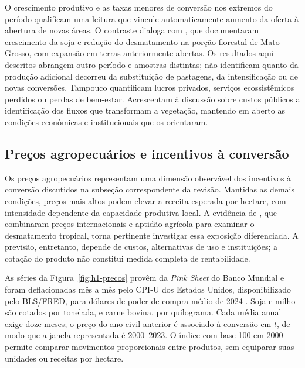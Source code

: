 \FloatBarrier
O crescimento produtivo e as taxas menores de conversão nos extremos do período qualificam uma leitura que vincule automaticamente aumento da oferta à abertura de novas áreas. O contraste dialoga com , que documentaram crescimento da soja e redução do desmatamento na porção florestal de Mato Grosso, com expansão em terras anteriormente abertas. Os resultados aqui descritos abrangem outro período e amostras distintas; não identificam quanto da produção adicional decorreu da substituição de pastagens, da intensificação ou de novas conversões. Tampouco quantificam lucros privados, serviços ecossistêmicos perdidos ou perdas de bem-estar. Acrescentam à discussão sobre custos públicos a identificação dos fluxos que transformam a vegetação, mantendo em aberto as condições econômicas e institucionais que os orientaram.

\FloatBarrier
\subsection{Preços agropecuários e incentivos à conversão}
\label{subsec:mt-precos}

Os preços agropecuários representam uma dimensão observável dos incentivos à conversão discutidos na subseção correspondente da revisão. Mantidas as demais condições, preços mais altos podem elevar a receita esperada por hectare, com intensidade dependente da capacidade produtiva local. A evidência de , que combinaram preços internacionais e aptidão agrícola para examinar o desmatamento tropical, torna pertinente investigar essa exposição diferenciada. A previsão, entretanto, depende de custos, alternativas de uso e instituições; a cotação do produto não constitui medida completa de rentabilidade.

As séries da Figura~\ref{fig:h1-precos} provêm da \textit{Pink Sheet} do Banco Mundial \cite{WorldBank2026} e foram deflacionadas mês a mês pelo CPI-U dos Estados Unidos, disponibilizado pelo BLS/FRED, para dólares de poder de compra médio de 2024 \cite{BLSCPI2026}. Soja e milho são cotados por tonelada, e carne bovina, por quilograma. Cada média anual exige doze meses; o preço do ano civil anterior é associado à conversão em $t$, de modo que a janela representada é 2000--2023. O índice com base 100 em 2000 permite comparar movimentos proporcionais entre produtos, sem equiparar suas unidades ou receitas por hectare.

